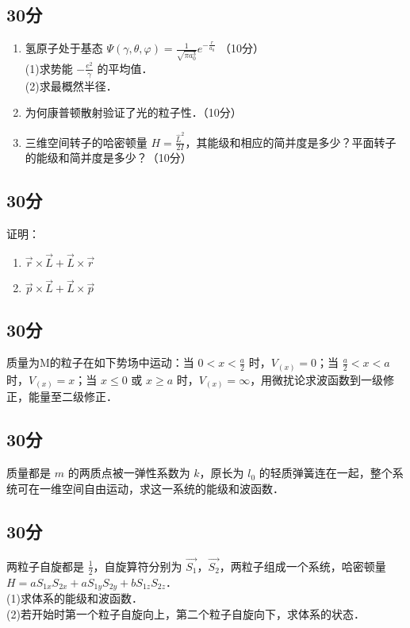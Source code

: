 
\subsection{30分}
\begin{enumerate}
\item 氢原子处于基态 $\varPsi(\gamma,\theta,\varphi)=\frac{1}{\sqrt{\pi a^{3}_{0}}}e^{-\frac{r}{a_0}}$ （10分）\\
(1)求势能 $-\frac{e^2}{\gamma}$ 的平均值．\\
(2)求最概然半径．\\
\item 为何康普顿散射验证了光的粒子性．（10分）\\
\item 三维空间转子的哈密顿量 $H=\frac{\hat{L}^2}{2I}$，其能级和相应的简并度是多少？平面转子的能级和简并度是多少？（10分）\\
\end{enumerate}
\subsection{30分}
证明：\\
\begin{enumerate}
\item $\vec{r}\times \vec{L}+ \vec{L}\times \vec{r}$
\item $\vec{p}\times\vec{L}+\vec{L}\times\vec{p}$
\end{enumerate}
\subsection{30分}
质量为M的粒子在如下势场中运动：当 $0<x<\frac{a}{2}$ 时，$V_{(x)}=0$；当 $\frac{a}{2} <x<a$ 时，$V_{(x)}=x$；当 $x \le 0$ 或 $x \ge a$ 时，$V_{(x)}=\infty$，用微扰论求波函数到一级修正，能量至二级修正．
\subsection{30分}
质量都是 $m$ 的两质点被一弹性系数为 $k$，原长为 $l_{0}$ 的轻质弹簧连在一起，整个系统可在一维空间自由运动，求这一系统的能级和波函数．
\subsection{30分}
两粒子自旋都是 $\frac{1}{2}$，自旋算符分别为 $\vec{S_{1}}$，$\vec{S_{2}}$，两粒子组成一个系统，哈密顿量 $H=aS_{1x}S_{2x}+aS_{1y}S_{2y}+bS_{1z}S_{2z}$．\\
(1)求体系的能级和波函数．\\
(2)若开始时第一个粒子自旋向上，第二个粒子自旋向下，求体系的状态．\\